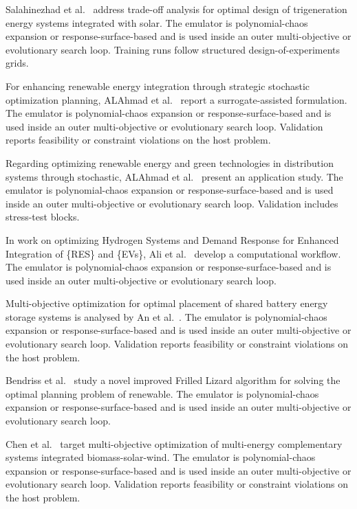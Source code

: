 Salahinezhad et al.~\cite{Salahinezhad2025} address trade-off analysis for optimal design of trigeneration energy systems integrated with solar. The emulator is polynomial-chaos expansion or response-surface-based and is used inside an outer multi-objective or evolutionary search loop. Training runs follow structured design-of-experiments grids.

For enhancing renewable energy integration through strategic stochastic optimization planning, ALAhmad et al.~\cite{alahmad_enhancing_2025} report a surrogate-assisted formulation. The emulator is polynomial-chaos expansion or response-surface-based and is used inside an outer multi-objective or evolutionary search loop. Validation reports feasibility or constraint violations on the host problem.

Regarding optimizing renewable energy and green technologies in distribution systems through stochastic, ALAhmad et al.~\cite{alahmad_optimizing_2025} present an application study. The emulator is polynomial-chaos expansion or response-surface-based and is used inside an outer multi-objective or evolutionary search loop. Validation includes stress-test blocks.

In work on optimizing Hydrogen Systems and Demand Response for Enhanced Integration of \{RES\} and \{EVs\}, Ali et al.~\cite{ali_optimizing_2025} develop a computational workflow. The emulator is polynomial-chaos expansion or response-surface-based and is used inside an outer multi-objective or evolutionary search loop.

Multi-objective optimization for optimal placement of shared battery energy storage systems is analysed by An et al.~\cite{an_multi-objective_2025}. The emulator is polynomial-chaos expansion or response-surface-based and is used inside an outer multi-objective or evolutionary search loop. Validation reports feasibility or constraint violations on the host problem.

Bendriss et al.~\cite{bendriss_novel_2025} study a novel improved Frilled Lizard algorithm for solving the optimal planning problem of renewable. The emulator is polynomial-chaos expansion or response-surface-based and is used inside an outer multi-objective or evolutionary search loop.

Chen et al.~\cite{chen_multi-objective_2025-1} target multi-objective optimization of multi-energy complementary systems integrated biomass-solar-wind. The emulator is polynomial-chaos expansion or response-surface-based and is used inside an outer multi-objective or evolutionary search loop. Validation reports feasibility or constraint violations on the host problem.


